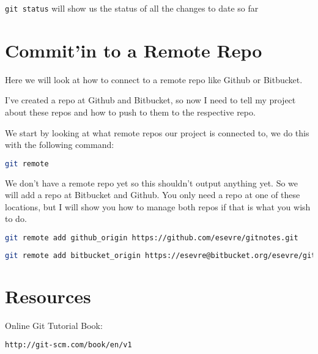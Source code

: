 \documentclass[a4paper]{spie} %
\begin{document}
\texttt{git status} will show us the status of all the changes to date so far



\section*{Commit'in to a Remote Repo}
Here we will look at how to connect to a remote repo like Github or Bitbucket. 

I've created a repo at Github and Bitbucket, so now I need to tell my project about these repos and how to push to them to the respective repo.

We start by looking at what remote repos our project is connected to, we do this with the following command:
\begin{lstlisting}[language=bash]
git remote
\end{lstlisting}

We don't have a remote repo yet so this shouldn't output anything yet. So we will add a repo at Bitbucket and Github. You only need a repo at one of these locations, but I will show you how to manage both repos if that is what you wish to do.


\begin{lstlisting}[language=bash]
git remote add github_origin https://github.com/esevre/gitnotes.git
\end{lstlisting}
\begin{lstlisting}[language=bash]
git remote add bitbucket_origin https://esevre@bitbucket.org/esevre/gitnotes.git
\end{lstlisting}



\section*{Resources}
Online Git Tutorial Book:
\begin{lstlisting}
http://git-scm.com/book/en/v1
\end{lstlisting}
\end{document}
